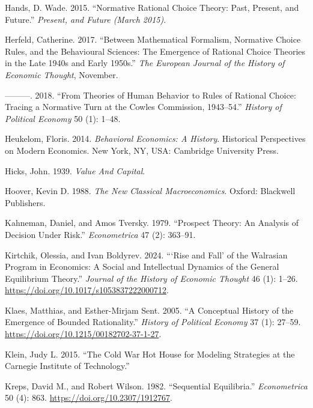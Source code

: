 \documentclass[
]{interact}
\newlength{\cslhangindent}
\newenvironment{CSLReferences}[2] %
 {\begin{list}{}{%
  \setlength{\itemindent}{0pt}
  \setlength{\leftmargin}{0pt}
  \setlength{\parsep}{0pt}
  \ifodd #1
   \setlength{\leftmargin}{\cslhangindent}
   \setlength{\itemindent}{-1\cslhangindent}
  \fi
  \setlength{\itemsep}{#2\baselineskip}}}
 {\end{list}}
\begin{document}
\begin{CSLReferences}{1}{0}
Hands, D. Wade. 2015. {``Normative Rational Choice Theory: Past,
Present, and Future.''} \emph{Present, and Future (March 2015)}.

Herfeld, Catherine. 2017. {``Between Mathematical Formalism, Normative
Choice Rules, and the Behavioural Sciences: {The} Emergence of Rational
Choice Theories in the Late 1940s and Early 1950s.''} \emph{The European
Journal of the History of Economic Thought}, November.

---------. 2018. {``From Theories of Human Behavior to Rules of Rational
Choice: Tracing a Normative Turn at the {Cowles Commission},
1943--54.''} \emph{History of Political Economy} 50 (1): 1--48.

Heukelom, Floris. 2014. \emph{Behavioral Economics: A History}.
Historical Perspectives on Modern Economics. New York, NY, USA:
Cambridge University Press.

Hicks, John. 1939. \emph{Value {And Capital}}.

Hoover, Kevin D. 1988. \emph{The New Classical Macroeconomics}. Oxford:
Blackwell Publishers.

Kahneman, Daniel, and Amos Tversky. 1979. {``Prospect Theory: {An}
Analysis of Decision Under Risk.''} \emph{Econometrica} 47 (2): 363--91.

Kirtchik, Olessia, and Ivan Boldyrev. 2024. {``{`{Rise} and {Fall}'} of
the {Walrasian Program} in {Economics}: {A Social} and {Intellectual
Dynamics} of the {General Equilibrium Theory}.''} \emph{Journal of the
History of Economic Thought} 46 (1): 1--26.
\url{https://doi.org/10.1017/s1053837222000712}.

Klaes, Matthias, and Esther-Mirjam Sent. 2005. {``A {Conceptual History}
of the {Emergence} of {Bounded Rationality}.''} \emph{History of
Political Economy} 37 (1): 27--59.
\url{https://doi.org/10.1215/00182702-37-1-27}.

Klein, Judy L. 2015. {``The {Cold War Hot House} for {Modeling
Strategies} at the {Carnegie Institute} of {Technology}.''}

Kreps, David M., and Robert Wilson. 1982. {``Sequential {Equilibria}.''}
\emph{Econometrica} 50 (4): 863. \url{https://doi.org/10.2307/1912767}.


\end{CSLReferences}
\end{document}
